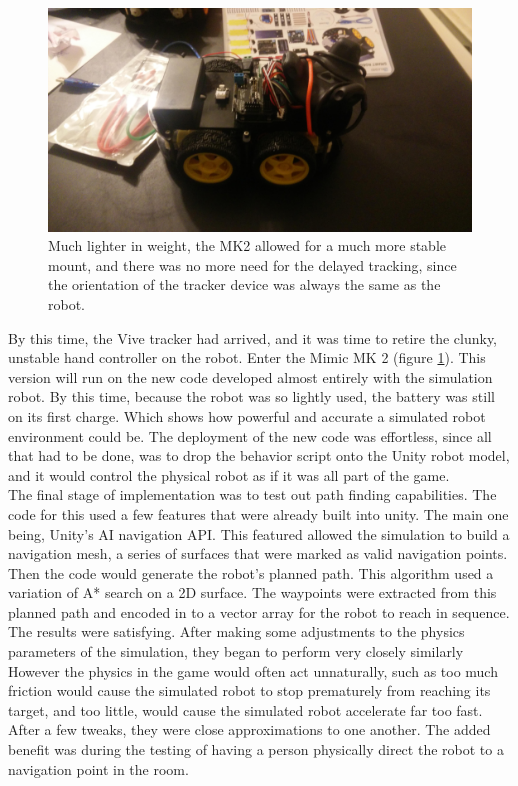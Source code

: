 \documentclass[10pt,a4paper]{article}
\begin{document}
	\begin{figure}
		\centering
		\includegraphics[width=.6\textwidth]{robotv2.jpg}
		\caption{Much lighter in weight, the MK2 allowed for a much more stable mount, and there was no more need for the delayed tracking, since the orientation of the tracker device was always the same as the robot.}
		\label{fig:mimic-mk2}
	\end{figure}
	
	By this time, the Vive tracker had arrived, and it was time to retire the clunky, unstable hand controller on the robot. Enter the Mimic MK 2 (figure \ref{fig:mimic-mk2}). This version will run on the new code developed almost entirely with the simulation robot. By this time, because the robot was so lightly used, the battery was still on its first charge. Which shows how powerful and accurate a simulated robot environment could be. The deployment of the new code was effortless, since all that had to be done, was to drop the behavior script onto the Unity robot model, and it would control the physical robot as if it was all part of the game.
	\\
	The final stage of implementation was to test out path finding capabilities. The code for this used a few features that were already built into unity. The main one being, Unity's AI navigation API. This featured allowed the simulation to build a navigation mesh, a series of surfaces that were marked as valid navigation points. Then the code would generate the robot's planned path. This algorithm used a variation of A* search on a 2D surface. The waypoints were extracted from this planned path and encoded in to a vector array for the robot to reach in sequence. The results were satisfying. After making some adjustments to the physics parameters of the simulation, they began to perform very closely similarly However the physics in the game would often act unnaturally, such as too much friction would cause the simulated robot to stop prematurely from reaching its target, and too little, would cause the simulated robot accelerate far too fast. After a few tweaks, they were close approximations to one another. The added benefit was during the testing of having a person physically direct the robot to a navigation point in the room. 
	
\end{document}
